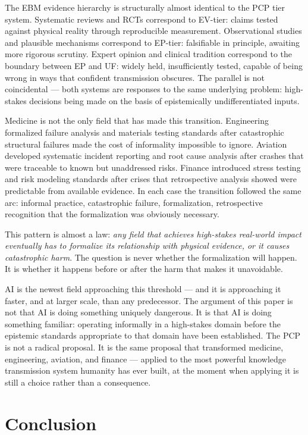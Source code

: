 \documentclass[12pt]{article}
\begin{document}
The EBM evidence hierarchy is structurally almost identical to the PCP
tier system. Systematic reviews and RCTs correspond to EV-tier: claims
tested against physical reality through reproducible measurement.
Observational studies and plausible mechanisms correspond to EP-tier:
falsifiable in principle, awaiting more rigorous scrutiny. Expert
opinion and clinical tradition correspond to the boundary between EP and
UF: widely held, insufficiently tested, capable of being wrong in ways
that confident transmission obscures. The parallel is not coincidental
--- both systems are responses to the same underlying problem:
high-stakes decisions being made on the basis of epistemically
undifferentiated inputs.

Medicine is not the only field that has made this transition.
Engineering formalized failure analysis and materials testing standards
after catastrophic structural failures made the cost of informality
impossible to ignore. Aviation developed systematic incident reporting
and root cause analysis after crashes that were traceable to known but
unaddressed risks. Finance introduced stress testing and risk modeling
standards after crises that retrospective analysis showed were
predictable from available evidence. In each case the transition
followed the same arc: informal practice, catastrophic failure,
formalization, retrospective recognition that the formalization was
obviously necessary.

This pattern is almost a law: \emph{any field that achieves high-stakes
real-world impact eventually has to formalize its relationship with
physical evidence, or it causes catastrophic harm}. The question is
never whether the formalization will happen. It is whether it happens
before or after the harm that makes it unavoidable.

AI is the newest field approaching this threshold --- and it is
approaching it faster, and at larger scale, than any predecessor. The
argument of this paper is not that AI is doing something uniquely
dangerous. It is that AI is doing something familiar: operating
informally in a high-stakes domain before the epistemic standards
appropriate to that domain have been established. The PCP is not a
radical proposal. It is the same proposal that transformed medicine,
engineering, aviation, and finance --- applied to the most powerful
knowledge transmission system humanity has ever built, at the moment
when applying it is still a choice rather than a consequence.

\section{Conclusion}\label{conclusion}
\end{document}
